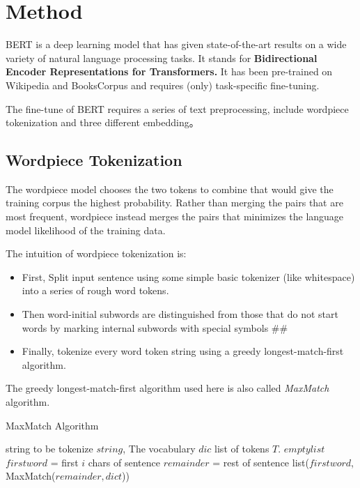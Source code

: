 \section{Method} \label{sec-method}
BERT is a deep learning model that has given state-of-the-art results on 
a wide variety of natural language processing tasks. 
It stands for \textbf{Bidirectional Encoder Representations for Transformers.}
It has been pre-trained on Wikipedia and BooksCorpus and requires (only) task-specific fine-tuning.

The fine-tune of BERT requires a series of text preprocessing, include wordpiece tokenization and 
three different embedding。
\subsection{Wordpiece Tokenization}
The wordpiece model chooses the two tokens to combine that 
would give the training corpus the highest probability.
Rather than merging the pairs that are most frequent, 
wordpiece instead merges the pairs that minimizes 
the language model likelihood of the training data.

The intuition of wordpiece tokenization is:
\begin{itemize}
    \item First, Split input sentence using some simple basic tokenizer (like whitespace) into a series of rough word tokens.
    \item Then word-initial subwords are distinguished from those that do not start words by marking internal subwords with special symbols \#\#
    \item Finally, tokenize every word token string using a greedy longest-match-first algorithm.
\end{itemize}

The greedy longest-match-first algorithm used here is also called \emph{MaxMatch} algorithm.
\begin{algorithm}[htbp]
	\small
	\caption{MaxMatch Algorithm}
	\label{alg:maxmatch}
	\begin{algorithmic}[1]
		\REQUIRE
        string to be tokenize $string$,
        The vocabulary $dic$
		\ENSURE
        list of tokens $T$.
        \RETURN $empty list$
        \ENDIF
        \STATE $firstword$ = first $i$ chars of sentence
        \STATE $remainder$ = rest of sentence
        \RETURN list($firstword$, MaxMatch($remainder, dict$))
        \ENDIF
        \ENDFOR
	\end{algorithmic}
\end{algorithm}
